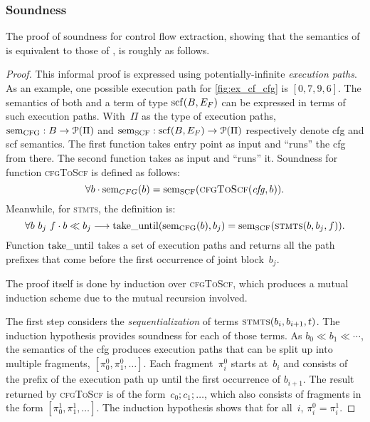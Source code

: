 \subsubsection{Soundness}
The proof of soundness for control flow extraction,
showing that the semantics of  is equivalent to those of ,
is roughly as follows.
\begin{proof}
  This informal proof is expressed using potentially-infinite \emph{execution paths}.%
  As an example, one possible execution path for \cref{fig:ex_cf_cfg}
  is $[0, 7, 9, 6]$.
  The semantics of both  and a term of type $\operatorname{scf}(B,E_F)$
  can be expressed in terms of such execution paths.
  With~$\Pi$ as the type of execution paths,%
  $\operatorname{sem}_\mathrm{CFG}:B\rightarrow\operatorname{\mathcal{P}}(\Pi)$ and
  $\operatorname{sem}_\mathrm{SCF}:\operatorname{scf}(B,E_F)\rightarrow\operatorname{\mathcal{P}}(\Pi)$ respectively denote
  \ac{cfg} and \ac{scf} semantics.
  The first function takes  entry point as input
  and ``runs'' the \ac{cfg} from there.
  The second function takes  as input and ``runs'' it.
  Soundness for function \textsc{cfgToScf} is defined as follows:
  \begin{equation}
    \forall b\cdot\operatorname{sem}_{CFG}(b)=\operatorname{sem}_\mathrm{SCF}(\textsc{cfgToScf}(\mathit{cfg},b)).
  \end{equation}
    Meanwhile, for \textsc{stmts}, the definition is:
  \begin{equation}
    \forall b~b_j~f\cdot b\ll b_j\longrightarrow\operatorname{take\_until}(\operatorname{sem}_\mathrm{CFG}(b),b_j)
    =\operatorname{sem}_\mathrm{SCF}(\textsc{stmts}(b,b_j,f)).
  \end{equation}
  Function $\operatorname{take\_until}$ takes a set of execution paths
  and returns all the path prefixes
  that come before the first occurrence of joint block~$b_j$.

  The proof itself is done by induction over \textsc{cfgToScf},%
  which produces a mutual induction scheme due to the mutual recursion involved.
  
  The first step considers the \emph{sequentialization}
  of terms $\textsc{stmts}(b_i,b_{i+1},t)$.
  The induction hypothesis provides soundness for each of those terms.
  As $b_0\ll b_1\ll\dotsb$, the semantics of the \ac{cfg}
  produces execution paths that can be split up into multiple fragments,
  $[\pi^0_0, \pi^0_1,\dotsc]$.
  Each fragment~$\pi^0_i$ starts at~$b_i$
  and consists of the prefix of the execution path
  up until the first occurrence of $b_{i+1}$.
  The result returned by \textsc{cfgToScf} is of the form~$c_0;c_1;\dotso$,
  which also consists of fragments in the form $[\pi^1_0,\pi^1_1,\dotsc]$.
  The induction hypothesis shows that for all~$i$, $\pi^0_i=\pi^1_i$.
  

\end{proof}

